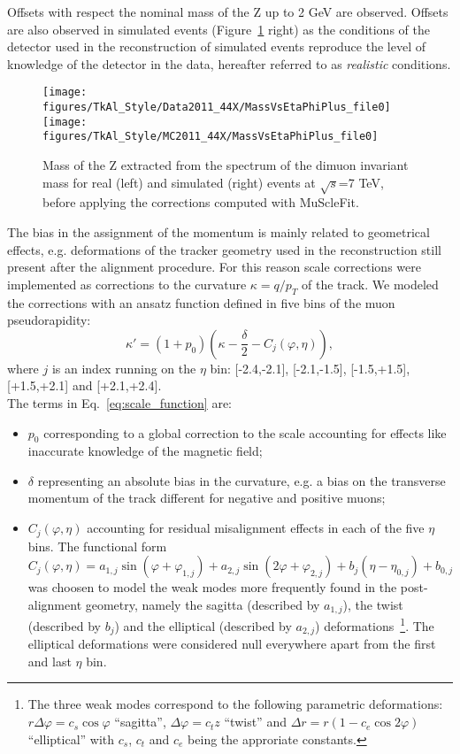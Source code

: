 Offsets with respect the nominal mass of the Z up to 2 GeV are observed. 
Offsets are also observed in simulated events
(Figure~\ref{fig:etaphi_44X_before} right) as the conditions of 
the detector used in the reconstruction of simulated events reproduce the
level of knowledge of the detector in the data, hereafter referred to
as {\sl realistic} conditions.
\begin{figure}[hbtp]  
\begin{center}
\texttt{[image: figures/TkAl\_Style/Data2011\_44X/MassVsEtaPhiPlus\_file0]}
\texttt{[image: figures/TkAl\_Style/MC2011\_44X/MassVsEtaPhiPlus\_file0]}
 \hspace{1cm} 
   \caption{Mass of the Z extracted from the spectrum of the dimuon
     invariant mass for real (left) and simulated (right) events at $\sqrt{s}$=7 TeV, before
     applying the corrections computed with MuScleFit.
   \label{fig:etaphi_44X_before}}
 \end{center}
\end{figure} 
The bias in the assignment of the momentum is mainly
related to geometrical effects, e.g. deformations of the tracker
geometry used in the reconstruction still present after the
alignment procedure.
For this reason scale corrections were implemented as corrections to the curvature
$\kappa=q/p_T$ of the track. We modeled the corrections with an ansatz function defined in five
bins of the muon pseudorapidity: 
\begin{equation}
\kappa' = (1+p_0) \left( \kappa -\frac{\delta}{2} - C_j(\varphi,\eta)  \right),
\label{eq:scale_function}
\end{equation}
where $j$ is an index running on the $\eta$ bin: [-2.4,-2.1],
[-2.1,-1.5], [-1.5,+1.5], [+1.5,+2.1] and [+2.1,+2.4].\\
The terms in Eq.~\ref{eq:scale_function} are:
\begin{itemize}
\item $p_0$ corresponding to a global correction to the scale accounting for effects
  like inaccurate knowledge of the magnetic field;
\item $\delta$ representing an absolute bias in the curvature, e.g. a
  bias on the transverse momentum of the track different for negative
  and positive muons;
\item $C_j(\varphi,\eta)$ accounting for residual misalignment effects
  in each of the five $\eta$ bins.
  The functional form 
  \[
  C_j(\varphi,\eta) = a_{1,j} \sin(\varphi+\varphi_{1,j}) + a_{2,j}
  \sin(2\varphi+\varphi_{2,j}) + b_j(\eta-\eta_{0,j}) + b_{0,j} 
  \]
  was choosen to model the weak modes more frequently
  found in the post-alignment geometry, namely the sagitta (described
  by $a_{1,j}$), the
  twist (described by $b_j$) and the elliptical (described
  by $a_{2,j}$) deformations~\footnote{
    The three weak modes correspond to the following parametric deformations:
    $r\Delta\varphi = c_s \cos\varphi$ ``sagitta'',
    $\Delta\varphi = c_t z$  ``twist'' and 
    $\Delta r = r (1- c_e \cos 2\varphi)$  ``elliptical''
    with $c_s$, $c_t$ and $c_e$ being the approriate constants.}. 
  The elliptical deformations were considered null everywhere apart from 
  the first and last $\eta$ bin.
\end{itemize}
